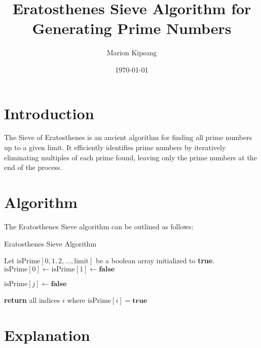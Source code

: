 \documentclass{article}
\title{Eratosthenes Sieve Algorithm for Generating Prime Numbers}
\author{Marion Kipsang}
\date{\today}
\begin{document}
\maketitle

\section{Introduction}

The Sieve of Eratosthenes is an ancient algorithm for finding all prime numbers up to a given limit. It efficiently identifies prime numbers by iteratively eliminating multiples of each prime found, leaving only the prime numbers at the end of the process.

\section{Algorithm}

The Eratosthenes Sieve algorithm can be outlined as follows:

\begin{algorithm}
\caption{Eratosthenes Sieve Algorithm}\label{eratosthenes-sieve}
\begin{algorithmic}[1]
    \State Let $\text{isPrime}[0, 1, 2, \ldots, \text{limit}]$ be a boolean array initialized to \textbf{true}.
    \State $\text{isPrime}[0] \gets \text{isPrime}[1] \gets \textbf{false}$ 
    
     
         
             
                \State $\text{isPrime}[j] \gets \textbf{false}$
            \EndFor
        \EndIf
    \EndFor
    
    \State \textbf{return} all indices $i$ where $\text{isPrime}[i] = \textbf{true}$
\EndProcedure
\end{algorithmic}
\end{algorithm}

\section{Explanation}
\end{document}
